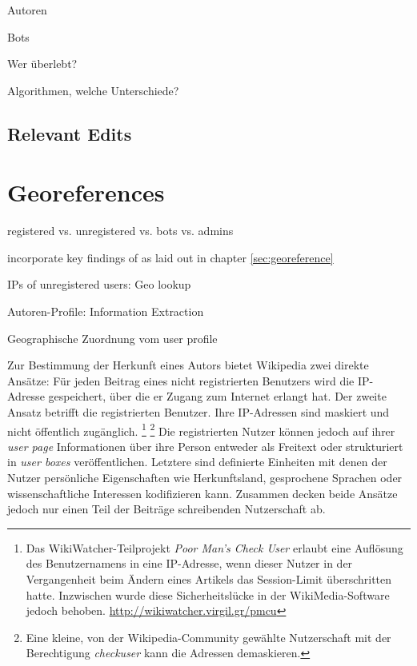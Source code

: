 \begin{todos}
    \item Autoren
    \item Bots
    \item Wer überlebt?
    \item Algorithmen, welche Unterschiede?
\end{todos}

\subsection{Relevant Edits}




\section{Georeferences}

\begin{todos}
    \item registered vs. unregistered vs. bots vs. admins
    \item incorporate key findings of \cite{hardy2011volunteered} as laid out in chapter \ref{sec:georeference}
    \item IPs of unregistered users: Geo lookup
    \item Autoren-Profile: Information Extraction
    \item Geographische Zuordnung vom user profile
\end{todos}

Zur Bestimmung der Herkunft eines Autors bietet Wikipedia zwei direkte Ansätze: 
Für jeden Beitrag eines nicht registrierten Benutzers wird die IP-Adresse gespeichert, über die er Zugang zum Internet erlangt hat. 
Der zweite Ansatz betrifft die registrierten Benutzer.
Ihre IP-Adressen sind maskiert und nicht öffentlich zugänglich.
\footnote{Das WikiWatcher-Teilprojekt \emph{Poor Man's Check User} erlaubt eine Auflösung des Benutzernamens in eine IP-Adresse, wenn dieser Nutzer in der Vergangenheit beim Ändern eines Artikels das Session-Limit überschritten hatte. Inzwischen wurde diese Sicherheitslücke in der WikiMedia-Software jedoch behoben. \url{http://wikiwatcher.virgil.gr/pmcu}}
\footnote{Eine kleine, von der Wikipedia-Community gewählte Nutzerschaft mit der Berechtigung \emph{checkuser} kann die Adressen demaskieren.}
Die registrierten Nutzer können jedoch auf ihrer \emph{user page} Informationen über ihre Person entweder als Freitext oder strukturiert in \emph{user boxes} veröffentlichen.
Letztere sind definierte Einheiten mit denen der Nutzer persönliche Eigenschaften wie Herkunftsland, gesprochene Sprachen oder wissenschaftliche Interessen kodifizieren kann.
Zusammen decken beide Ansätze jedoch nur einen Teil der Beiträge schreibenden Nutzerschaft ab.


